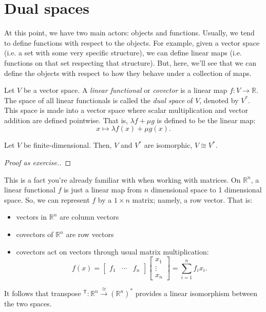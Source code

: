 \section{Dual spaces}
At this point, we have two main actors: objects and
functions. Usually, we tend to define functions with respect to the
objects. For example, given a vector space (i.e. a set with some very
specific structure), we can define linear maps (i.e. functions on that
set respecting that structure). But, here, we'll see that we can
define the objects with respect to how they behave under a collection
of maps. 

\begin{definition}
Let $V$ be a vector space. A \emph{linear functional} or
\emph{covector} is a linear map $f: V \to \mathbb{R}$. The space of
all linear functionals is called the \emph{dual space} of $V$, denoted
by $V^*$. This space is made into a vector space where scalar
multiplication and vector addition are defined pointwise. That is,
$\lambda f + \mu g$ is defined to be the linear map: 
\[x \mapsto \lambda f(x) + \mu g(x).\]
\end{definition}

\begin{proposition}
Let $V$ be finite-dimensional. Then, $V$ and $V^*$ are isomorphic, $V
\cong V^*$. 
\end{proposition}
\begin{proof}[Proof as exercise.]
\end{proof}

This is a fact you're already familiar with when working with
matrices. On $\mathbb{R}^n$, a linear functional $f$ is just a linear
map from $n$ dimensional space to 1 dimensional space. So, we can
represent $f$ by a $1 \times n$ matrix; namely, a row vector. That is: 
\begin{itemize}
    \item vectors in $\mathbb{R}^n$ are column vectors
    \item covectors of $\mathbb{R}^n$ are row vectors
    \item covectors act on vectors through usual matrix multiplication:
    \[f(x) = \begin{bmatrix} f_1 & \dotsm &
      f_n \end{bmatrix} \begin{bmatrix} x_1 \\ \vdots
      \\ x_n \end{bmatrix} = \sum_{i=1}^n f_i x_i.\] 
\end{itemize}
It follows that transpose $ ^\mathsf{T}: \mathbb{R}^n
\overset{\cong}{\longrightarrow} (\mathbb{R}^n)^*$ provides a linear
isomorphism between the two spaces. 

